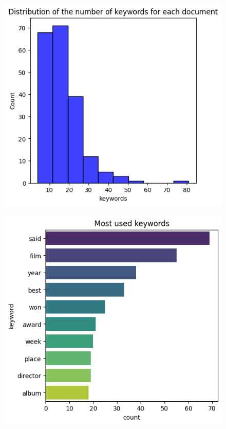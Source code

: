 \begin{figure}[H]
  \begin{minipage}{.5\textwidth}
    \centering
    \includegraphics[width=1\linewidth]{images/keyword_distribution.png}
    \label{fig:question4_1} 
  \end{minipage}
  \begin{minipage}{.5\textwidth}
    \centering
    \includegraphics[width=1\linewidth]{images/keyword_distribution_ranks.png}
    \label{fig:question4_2}
  \end{minipage}
\end{figure}

